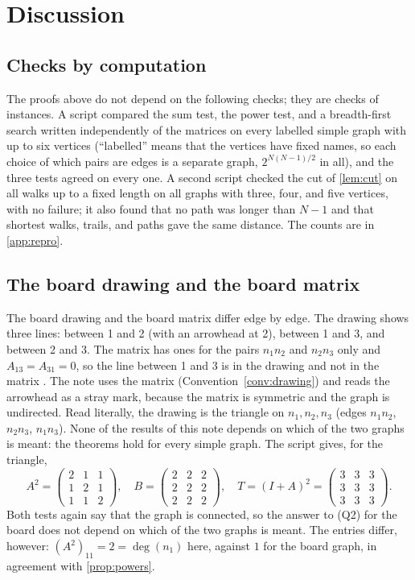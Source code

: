 \section{Discussion}\label{sec:discussion}

\subsection{Checks by computation}

The proofs above do not depend on the following checks; they are checks of
instances. A script compared the sum test, the power test, and a
breadth-first search written independently of the matrices on every
labelled simple graph with up to six vertices (``labelled'' means that the
vertices have fixed names, so each choice of which pairs are edges is a
separate graph, $2^{N(N-1)/2}$ in all), and the three tests agreed on every
one. A second script checked the cut of \cref{lem:cut} on all walks up to a
fixed length on all graphs with three, four, and five vertices, with no
failure; it also found that no path was longer than $N-1$ and that shortest
walks, trails, and paths gave the same distance. The counts are in
\cref{app:repro}.

\subsection{The board drawing and the board matrix}\label{sec:drawing}

The board drawing and the board matrix differ edge by edge. The drawing
shows three lines: between 1 and 2 (with an arrowhead at 2), between 1 and
3, and between 2 and 3. The matrix has ones for the pairs $n_1n_2$ and
$n_2n_3$ only and $A_{13}=A_{31}=0$, so the line between 1 and 3 is in the
drawing and not in the matrix \cite{whiteboard1,whiteboard2}. The note uses
the matrix (Convention~\ref{conv:drawing}) and reads the arrowhead as a
stray mark, because the matrix is symmetric and the graph is undirected.
Read literally, the drawing is the triangle on $n_1,n_2,n_3$ (edges $n_1n_2$,
$n_2n_3$, $n_1n_3$). None of the results of this note depends on which of
the two graphs is meant: the theorems hold for every simple graph. The script
gives, for the triangle,
\[
A^2=\begin{pmatrix}2&1&1\\1&2&1\\1&1&2\end{pmatrix},\quad
B=\begin{pmatrix}2&2&2\\2&2&2\\2&2&2\end{pmatrix},\quad
T=(I+A)^2=\begin{pmatrix}3&3&3\\3&3&3\\3&3&3\end{pmatrix}.
\]
Both tests again say that the graph is connected, so the answer to (Q2)
for the board does not depend on which of the two graphs is meant. The
entries differ, however: $(A^2)_{11}=2=\deg(n_1)$ here, against $1$ for the
board graph, in agreement with \cref{prop:powers}.

